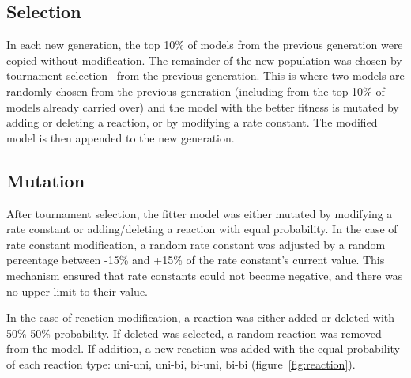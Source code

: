 \documentclass[12pt]{report}
\begin{document}
\subsection{Selection}
In each new generation, the top 10\% of models from the previous generation were copied without modification. The remainder of the new population was chosen by tournament selection~\cite{Miller1995} from the previous generation. This is where two models are randomly chosen from the previous generation (including from the top 10\% of models already carried over) and the model with the better fitness is mutated by adding or deleting a reaction, or by modifying a rate constant. The modified model is then appended to the new generation. 

\subsection{Mutation}
After tournament selection, the fitter model was either mutated by modifying a rate constant or adding/deleting a reaction with equal probability. In the case of rate constant modification, a random rate constant was adjusted by a random percentage between -15\% and +15\% of the rate constant's current value. This mechanism ensured that rate constants could not become negative, and there was no upper limit to their value. 

In the case of reaction modification, a reaction was either added or deleted with 50\%-50\% probability. If deleted was selected, a random reaction was removed from the model. If addition, a new reaction was added with the equal probability of each reaction type: uni-uni, uni-bi, bi-uni, bi-bi (figure~\ref{fig:reaction}). 
\end{document}

